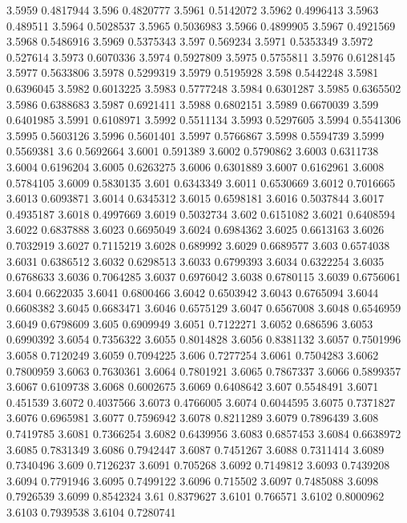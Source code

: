 3.5959  0.4817944
3.596  0.4820777
3.5961  0.5142072
3.5962  0.4996413
3.5963  0.489511
3.5964  0.5028537
3.5965  0.5036983
3.5966  0.4899905
3.5967  0.4921569
3.5968  0.5486916
3.5969  0.5375343
3.597  0.569234
3.5971  0.5353349
3.5972  0.527614
3.5973  0.6070336
3.5974  0.5927809
3.5975  0.5755811
3.5976  0.6128145
3.5977  0.5633806
3.5978  0.5299319
3.5979  0.5195928
3.598  0.5442248
3.5981  0.6396045
3.5982  0.6013225
3.5983  0.5777248
3.5984  0.6301287
3.5985  0.6365502
3.5986  0.6388683
3.5987  0.6921411
3.5988  0.6802151
3.5989  0.6670039
3.599  0.6401985
3.5991  0.6108971
3.5992  0.5511134
3.5993  0.5297605
3.5994  0.5541306
3.5995  0.5603126
3.5996  0.5601401
3.5997  0.5766867
3.5998  0.5594739
3.5999  0.5569381
3.6  0.5692664
3.6001  0.591389
3.6002  0.5790862
3.6003  0.6311738
3.6004  0.6196204
3.6005  0.6263275
3.6006  0.6301889
3.6007  0.6162961
3.6008  0.5784105
3.6009  0.5830135
3.601  0.6343349
3.6011  0.6530669
3.6012  0.7016665
3.6013  0.6093871
3.6014  0.6345312
3.6015  0.6598181
3.6016  0.5037844
3.6017  0.4935187
3.6018  0.4997669
3.6019  0.5032734
3.602  0.6151082
3.6021  0.6408594
3.6022  0.6837888
3.6023  0.6695049
3.6024  0.6984362
3.6025  0.6613163
3.6026  0.7032919
3.6027  0.7115219
3.6028  0.689992
3.6029  0.6689577
3.603  0.6574038
3.6031  0.6386512
3.6032  0.6298513
3.6033  0.6799393
3.6034  0.6322254
3.6035  0.6768633
3.6036  0.7064285
3.6037  0.6976042
3.6038  0.6780115
3.6039  0.6756061
3.604  0.6622035
3.6041  0.6800466
3.6042  0.6503942
3.6043  0.6765094
3.6044  0.6608382
3.6045  0.6683471
3.6046  0.6575129
3.6047  0.6567008
3.6048  0.6546959
3.6049  0.6798609
3.605  0.6909949
3.6051  0.7122271
3.6052  0.686596
3.6053  0.6990392
3.6054  0.7356322
3.6055  0.8014828
3.6056  0.8381132
3.6057  0.7501996
3.6058  0.7120249
3.6059  0.7094225
3.606  0.7277254
3.6061  0.7504283
3.6062  0.7800959
3.6063  0.7630361
3.6064  0.7801921
3.6065  0.7867337
3.6066  0.5899357
3.6067  0.6109738
3.6068  0.6002675
3.6069  0.6408642
3.607  0.5548491
3.6071  0.451539
3.6072  0.4037566
3.6073  0.4766005
3.6074  0.6044595
3.6075  0.7371827
3.6076  0.6965981
3.6077  0.7596942
3.6078  0.8211289
3.6079  0.7896439
3.608  0.7419785
3.6081  0.7366254
3.6082  0.6439956
3.6083  0.6857453
3.6084  0.6638972
3.6085  0.7831349
3.6086  0.7942447
3.6087  0.7451267
3.6088  0.7311414
3.6089  0.7340496
3.609  0.7126237
3.6091  0.705268
3.6092  0.7149812
3.6093  0.7439208
3.6094  0.7791946
3.6095  0.7499122
3.6096  0.715502
3.6097  0.7485088
3.6098  0.7926539
3.6099  0.8542324
3.61  0.8379627
3.6101  0.766571
3.6102  0.8000962
3.6103  0.7939538
3.6104  0.7280741
